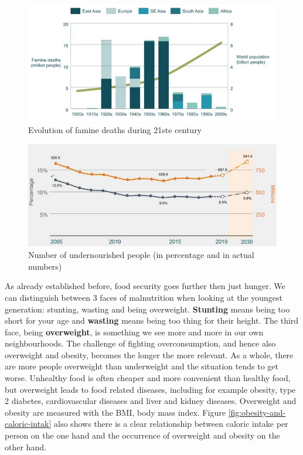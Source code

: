 \documentclass[../summary.tex]{subfiles}
\begin{document}
	\begin{figure} [htbp]
		\centering
		\includegraphics[width=1\linewidth]{images/6-famine.png}
		\caption{Evolution of famine deaths during 21ste century}
		\label{fig:famine}
	\end{figure}
	
	\begin{figure} [htbp]
		\centering
		\includegraphics[width=1\linewidth]{images/6-undernourishment.png}
		\caption{Number of undernourished people (in percentage and in actual numbers)}
		\label{fig:undernourishment}
	\end{figure}
	
	As already established before, food security goes further then just hunger. We can distinguish between 3 faces of malnutrition when looking at the youngest generation: stunting, wasting and being overweight.
	\textbf{Stunting} means being too short for your age and \textbf{wasting} means being too thing for their height. The third face, being \textbf{overweight}, is something we see more and more in our own neighbourhoods. The challenge of fighting overconsumption, and hence also overweight and obesity, becomes the longer the more relevant. As a whole, there are more people overweight than underweight and the situation tends to get worse. Unhealthy food is often cheaper and more convenient than healthy food, but overweight leads to food related diseases, including for example obesity, type 2 diabetes, cardiovascular diseases and liver and kidney diseases. Overweight and obesity are measured with the BMI, body mass index. Figure \ref{fig:obesity-and-caloric-intak} also shows there is a clear relationship between caloric intake per person on the one hand and the occurrence of overweight and obesity on the other hand.
	
\end{document}
